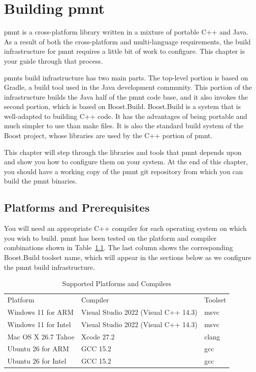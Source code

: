
\chapter{Building \acl{pmnt}}
\label{chapter-building-parliament}

\ac{pmnt} is a cross-platform library written in a mixture of portable C++ and Java. As a result of both the cross-platform and multi-language requirements, the build infrastructure for \ac{pmnt} requires a little bit of work to configure. This chapter is your guide through that process.

\acp{pmnt} build infrastructure has two main parts. The top-level portion is based on Gradle, a build tool used in the Java development community. This portion of the infrastructure builds the Java half of the \ac{pmnt} code base, and it also invokes the second portion, which is based on Boost.Build. Boost.Build is a system that is well-adapted to building C++ code. It has the advantages of being portable and much simpler to use than make files. It is also the standard build system of the Boost project, whose libraries are used by the C++ portion of \ac{pmnt}.

This chapter will step through the libraries and tools that \ac{pmnt} depends upon and show you how to configure them on your system. At the end of this chapter, you should have a working copy of the \ac{pmnt} git repository from which you can build the \ac{pmnt} binaries.

\section{Platforms and Prerequisites}

You will need an appropriate C++ compiler for each operating system on which you wish to build. \ac{pmnt} has been tested on the platform and compiler combinations shown in Table~\ref{platforms-and-compilers}. The last column shows the corresponding Boost.Build toolset name, which will appear in the sections below as we configure the \ac{pmnt} build infrastructure.

\begin{table}[htbp]
	\centering
	\begin{tabular}{lll}
		\toprule
		Platform & Compiler & Toolset \\
		\headingrule
		Windows 11 for ARM & Visual Studio 2022 (Visual C++ 14.3) & msvc \\
		\midrule
		Windows 11 for Intel & Visual Studio 2022 (Visual C++ 14.3) & msvc \\
		\midrule
		Mac OS X 26.7 Tahoe & Xcode 27.2 & clang \\
		\midrule
		Ubuntu 26 for ARM & GCC 15.2 & gcc \\
		\midrule
		Ubuntu 26 for Intel & GCC 15.2 & gcc \\
		\bottomrule
	\end{tabular}
	\caption{Supported Platforms and Compilers}
	\label{platforms-and-compilers}
\end{table}

